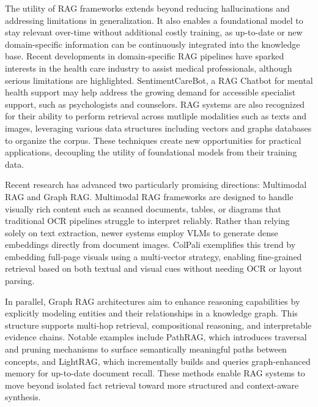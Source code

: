 \documentclass[12pt,twoside]{report}
\begin{document}
The utility of RAG frameworks extends beyond reducing hallucinations and addressing limitations in generalization. It also enables a foundational model to stay relevant over-time without additional costly training\cite{TrainingFrontierAICost}, as up-to-date or new domain-specific information can be continuously integrated into the knowledge base. Recent developments in domain-specific RAG pipelines have sparked interests in the health care industry to assist medical professionals, although serious limitations are highlighted\cite{RAGinHealthCare}. SentimentCareBot\cite{SentimentCareBot}, a RAG Chatbot for mental health support may help address the growing demand for accessible specialist support, such as psychologists and counselors.
RAG systems are also recognized for their ability to perform retrieval across mutliple modalities\cite{AskInAnyModality} such as texts and images, leveraging various data structures including vectors and graphs databases to organize the corpus. These techniques create new opportunities for practical applications, decoupling the utility of foundational models from their training data.

Recent research has advanced two particularly promising directions: Multimodal RAG and Graph RAG. Multimodal RAG frameworks are designed to handle visually rich content such as scanned documents, tables, or diagrams that traditional OCR pipelines struggle to interpret reliably. Rather than relying solely on text extraction, newer systems employ VLMs to generate dense embeddings directly from document images. ColPali\cite{ColPali} exemplifies this trend by embedding full-page visuals using a multi-vector strategy, enabling fine-grained retrieval based on both textual and visual cues without needing OCR or layout parsing.

In parallel, Graph RAG architectures aim to enhance reasoning capabilities by explicitly modeling entities and their relationships in a knowledge graph. This structure supports multi-hop retrieval, compositional reasoning, and interpretable evidence chains. Notable examples include PathRAG\cite{PathRAG}, which introduces traversal and pruning mechanisms to surface semantically meaningful paths between concepts, and LightRAG\cite{LightRAG}, which incrementally builds and queries graph-enhanced memory for up-to-date document recall. These methods enable RAG systems to move beyond isolated fact retrieval toward more structured and context-aware synthesis.
\end{document}
